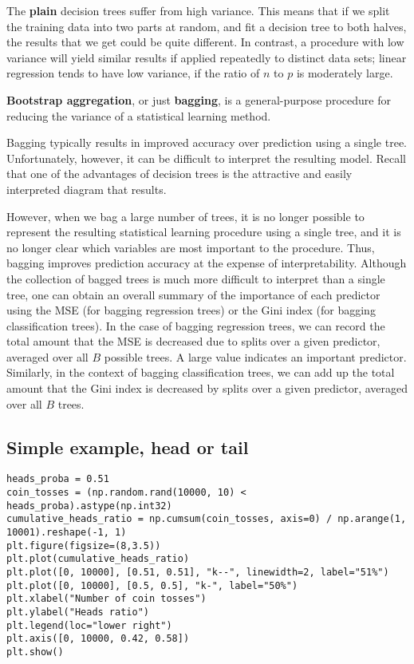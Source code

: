 \documentclass[%
oneside,                 %
final,                   %
10pt]{article}
\begin{document}
The \textbf{plain} decision trees suffer from high
variance. This means that if we split the training data into two parts
at random, and fit a decision tree to both halves, the results that we
get could be quite different. In contrast, a procedure with low
variance will yield similar results if applied repeatedly to distinct
data sets; linear regression tends to have low variance, if the ratio
of $n$ to $p$ is moderately large. 

\textbf{Bootstrap aggregation}, or just \textbf{bagging}, is a
general-purpose procedure for reducing the variance of a statistical
learning method. 


Bagging typically results in improved accuracy
over prediction using a single tree. Unfortunately, however, it can be
difficult to interpret the resulting model. Recall that one of the
advantages of decision trees is the attractive and easily interpreted
diagram that results.

However, when we bag a large number of trees, it is no longer
possible to represent the resulting statistical learning procedure
using a single tree, and it is no longer clear which variables are
most important to the procedure. Thus, bagging improves prediction
accuracy at the expense of interpretability.  Although the collection
of bagged trees is much more difficult to interpret than a single
tree, one can obtain an overall summary of the importance of each
predictor using the MSE (for bagging regression trees) or the Gini
index (for bagging classification trees). In the case of bagging
regression trees, we can record the total amount that the MSE is
decreased due to splits over a given predictor, averaged over all $B$ possible
trees. A large value indicates an important predictor. Similarly, in
the context of bagging classification trees, we can add up the total
amount that the Gini index  is decreased by splits over a given
predictor, averaged over all $B$ trees.

\subsection*{Simple example, head or tail}
\begin{verbatim}
heads_proba = 0.51
coin_tosses = (np.random.rand(10000, 10) < heads_proba).astype(np.int32)
cumulative_heads_ratio = np.cumsum(coin_tosses, axis=0) / np.arange(1, 10001).reshape(-1, 1)
plt.figure(figsize=(8,3.5))
plt.plot(cumulative_heads_ratio)
plt.plot([0, 10000], [0.51, 0.51], "k--", linewidth=2, label="51%")
plt.plot([0, 10000], [0.5, 0.5], "k-", label="50%")
plt.xlabel("Number of coin tosses")
plt.ylabel("Heads ratio")
plt.legend(loc="lower right")
plt.axis([0, 10000, 0.42, 0.58])
plt.show()

\end{verbatim}
\end{document}
